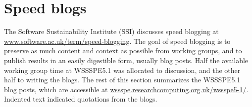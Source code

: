\documentclass[11pt,letterpaper]{article}
\newcommand{\note}[1]{ {\textcolor{blueish}        { ***Note: #1 }}}
\begin{document}
\section{Speed blogs} \label{sec:speed_blogs}



The Software Sustainability Institute (SSI) discusses speed blogging at \href{https://www.software.ac.uk/term/speed-blogging}{www.software.ac.uk/term/speed-blogging}.
%
The goal of speed blogging is to preserve as much content and context as possible from working groups, and to publish results in an easily digestible form, usually blog posts. 
Half the available working group time at WSSSPE5.1 was allocated to discussion, and the other half to writing the blogs. 
%
%
The rest of this section summarizes the WSSSPE5.1 blog posts, which are accessible at \href{http://wssspe.researchcomputing.org.uk/wssspe5-1/}{wssspe.researchcomputing.org.uk/wssspe5-1/}. Indented text indicated quotations from the blogs.
\end{document}
